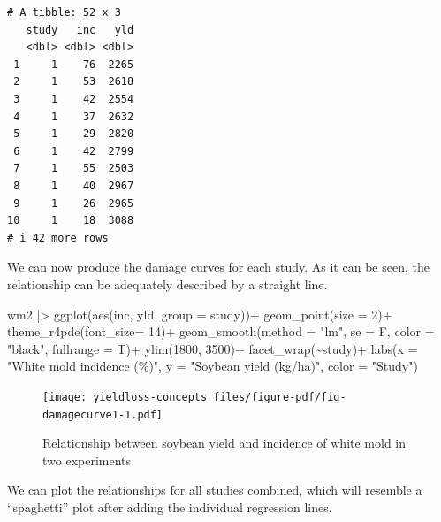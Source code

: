\documentclass[
  letterpaper,
]{book}
\newenvironment{Shaded}{\begin{snugshade}}{\end{snugshade}}
\newcommand{\AttributeTok}[1]{\textcolor[rgb]{0.40,0.45,0.13}{#1}}
\newcommand{\DecValTok}[1]{\textcolor[rgb]{0.68,0.00,0.00}{#1}}
\newcommand{\FunctionTok}[1]{\textcolor[rgb]{0.28,0.35,0.67}{#1}}
\newcommand{\NormalTok}[1]{\textcolor[rgb]{0.00,0.23,0.31}{#1}}
\newcommand{\SpecialCharTok}[1]{\textcolor[rgb]{0.37,0.37,0.37}{#1}}
\newcommand{\StringTok}[1]{\textcolor[rgb]{0.13,0.47,0.30}{#1}}
\begin{document}
\begin{verbatim}
# A tibble: 52 x 3
   study   inc   yld
   <dbl> <dbl> <dbl>
 1     1    76  2265
 2     1    53  2618
 3     1    42  2554
 4     1    37  2632
 5     1    29  2820
 6     1    42  2799
 7     1    55  2503
 8     1    40  2967
 9     1    26  2965
10     1    18  3088
# i 42 more rows
\end{verbatim}

We can now produce the damage curves for each study. As it can be seen,
the relationship can be adequately described by a straight line.

\begin{Shaded}
\begin{Highlighting}[]
\NormalTok{wm2 }\SpecialCharTok{|\textgreater{}} 
  \FunctionTok{ggplot}\NormalTok{(}\FunctionTok{aes}\NormalTok{(inc, yld, }
             \AttributeTok{group =}\NormalTok{ study))}\SpecialCharTok{+}
  \FunctionTok{geom\_point}\NormalTok{(}\AttributeTok{size =} \DecValTok{2}\NormalTok{)}\SpecialCharTok{+}
   \FunctionTok{theme\_r4pde}\NormalTok{(}\AttributeTok{font\_size=} \DecValTok{14}\NormalTok{)}\SpecialCharTok{+}
  \FunctionTok{geom\_smooth}\NormalTok{(}\AttributeTok{method =} \StringTok{"lm"}\NormalTok{, }\AttributeTok{se =}\NormalTok{ F, }\AttributeTok{color =} \StringTok{"black"}\NormalTok{, }\AttributeTok{fullrange =}\NormalTok{ T)}\SpecialCharTok{+}
  \FunctionTok{ylim}\NormalTok{(}\DecValTok{1800}\NormalTok{, }\DecValTok{3500}\NormalTok{)}\SpecialCharTok{+}
  \FunctionTok{facet\_wrap}\NormalTok{(}\SpecialCharTok{\textasciitilde{}}\NormalTok{study)}\SpecialCharTok{+}
  \FunctionTok{labs}\NormalTok{(}\AttributeTok{x =} \StringTok{"White mold incidence (\%)"}\NormalTok{,}
       \AttributeTok{y =} \StringTok{"Soybean yield (kg/ha)"}\NormalTok{,}
       \AttributeTok{color =} \StringTok{"Study"}\NormalTok{)}
\end{Highlighting}
\end{Shaded}

\begin{figure}[H]

{\centering \texttt{[image: yieldloss-concepts\_files/figure-pdf/fig-damagecurve1-1.pdf]}

}

\caption{\label{fig-damagecurve1}Relationship between soybean yield and
incidence of white mold in two experiments}

\end{figure}

We can plot the relationships for all studies combined, which will
resemble a ``spaghetti'' plot after adding the individual regression
lines.
\end{document}
